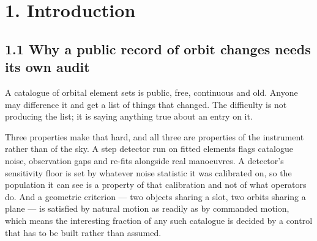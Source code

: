 \documentclass[11pt]{article}
\begin{document}
\begin{abstract}
Two structural limits bound everything above and are printed on the record itself. The first is that \textbf{the geostationary belt admits no leak-free passive control, and the reason is physics}: a stationed object that is not being controlled is a free librator, a slow librator dwells near occupied longitudes for months, and the approach detector's own registered dwell criterion is therefore met by motion no one commanded. Measured on 517,391 object-days of provably uncontrolled motion --- 30.9 times the exposure one expected event requires --- the approach detector fires at 1.845 times the active-payload rate [1.377, 2.431] and the trigger detector at 0.288 [0.279, 0.298], against a registered bar of 0.10, with none of nine pre-specified readings leak-free%
. The second is that \textbf{the alerts are a research instrument and not a warning product}: no timer runs, every alert on the public surface is a labelled replay of 2010 to 2020 on an injected clock, and the low-orbit arm publishes its own withheld gate rather than an alert, because its passive control fires at 0.797 of the rate it fires on objects that can manoeuvre against a design target of 0.001%
.

The record refuses to name a purpose, a target or a nation, and we report that refusal as a design result rather than as a limitation: what the surface can say is fixed by what has been measured, and every clause it cannot fill prints the measurement it is waiting for.

\end{abstract}

\section*{1. Introduction}

\subsection*{1.1 Why a public record of orbit changes needs its own audit}

A catalogue of orbital element sets is public, free, continuous and old. Anyone may difference it and get a list of things that changed. The difficulty is not producing the list; it is saying anything true about an entry on it.

Three properties make that hard, and all three are properties of the instrument rather than of the sky. A step detector run on fitted elements flags catalogue noise, observation gaps and re-fits alongside real manoeuvres. A detector's sensitivity floor is set by whatever noise statistic it was calibrated on, so the population it can see is a property of that calibration and not of what operators do. And a geometric criterion --- two objects sharing a slot, two orbits sharing a plane --- is satisfied by natural motion as readily as by commanded motion, which means the interesting fraction of any such catalogue is decided by a control that has to be built rather than assumed.
\end{document}
